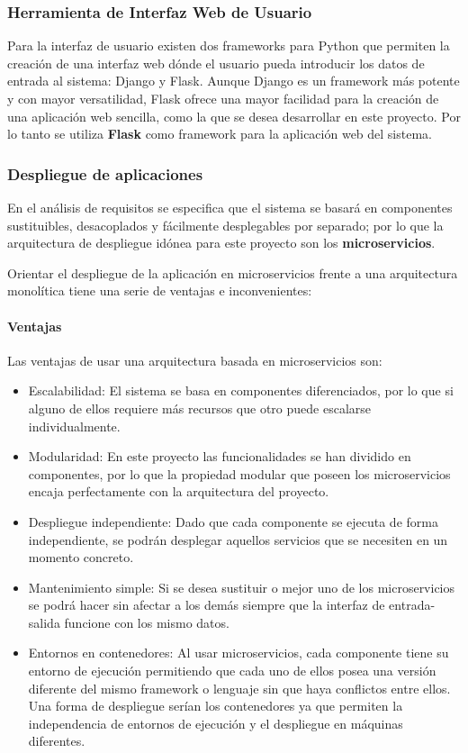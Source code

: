 \documentclass[../main.tex]{subfiles}
\begin{document}
\subsubsection{Herramienta de Interfaz Web de Usuario}\label{subsub:at-flask}
Para la interfaz de usuario existen dos frameworks para Python que permiten la creación de una interfaz web dónde el usuario pueda introducir los datos de entrada al sistema: Django y Flask. Aunque Django\cite{} es un framework más potente y con mayor versatilidad, Flask\cite{} ofrece una mayor facilidad para la creación de una aplicación web sencilla, como la que se desea desarrollar en este proyecto. Por lo tanto se utiliza \textbf{Flask} como framework para la aplicación web del sistema.

\subsubsection{Despliegue de aplicaciones}\label{subsub:at-vagrant}
En el análisis de requisitos se especifica que el sistema se basará en componentes sustituibles, desacoplados y fácilmente desplegables por separado; por lo que la arquitectura de despliegue idónea para este proyecto son los \textbf{microservicios}.

Orientar el despliegue de la aplicación en microservicios frente a una arquitectura monolítica tiene una serie de ventajas e inconvenientes:

\paragraph{Ventajas}
Las ventajas de usar una arquitectura basada en microservicios son:
\begin{itemize}
    \item Escalabilidad: El sistema se basa en componentes diferenciados, por lo que si alguno de ellos requiere más recursos que otro puede escalarse individualmente.
    \item Modularidad: En este proyecto las funcionalidades se han dividido en componentes, por lo que la propiedad modular que poseen los microservicios encaja perfectamente con la arquitectura del proyecto.
    \item Despliegue independiente: Dado que cada componente se ejecuta de forma independiente, se podrán desplegar aquellos servicios que se necesiten en un momento concreto.
    \item Mantenimiento simple: Si se desea sustituir o mejor uno de los microservicios se podrá hacer sin afectar a los demás siempre que la interfaz de entrada-salida funcione con los mismo datos.
    \item Entornos en contenedores: Al usar microservicios, cada componente tiene su entorno de ejecución permitiendo que cada uno de ellos posea una versión diferente del mismo framework o lenguaje sin que haya conflictos entre ellos. Una forma de despliegue serían los contenedores ya que permiten la independencia de entornos de ejecución y el despliegue en máquinas diferentes.
\end{itemize}
\end{document}
